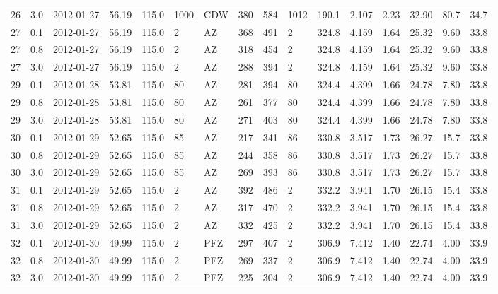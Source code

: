 {{\begin{landscape}
\begin{longtable}{llllllllllllllll}
26 & 3.0 & 2012-01-27 & \textminus{}56.19 & 115.0 & 1000 & CDW & 380 & 584 & 1012 & 190.1 & 2.107 & 2.23 & 32.90 & 80.7 & 34.7\\
27 & 0.1 & 2012-01-27 & \textminus{}56.19 & 115.0 & 2 & AZ & 368 & 491 & 2 & 324.8 & 4.159 & 1.64 & 25.32 & 9.60 & 33.8\\
27 & 0.8 & 2012-01-27 & \textminus{}56.19 & 115.0 & 2 & AZ & 318 & 454 & 2 & 324.8 & 4.159 & 1.64 & 25.32 & 9.60 & 33.8\\
27 & 3.0 & 2012-01-27 & \textminus{}56.19 & 115.0 & 2 & AZ & 288 & 394 & 2 & 324.8 & 4.159 & 1.64 & 25.32 & 9.60 & 33.8\\
29 & 0.1 & 2012-01-28 & \textminus{}53.81 & 115.0 & 80 & AZ & 281 & 394 & 80 & 324.4 & 4.399 & 1.66 & 24.78 & 7.80 & 33.8\\
29 & 0.8 & 2012-01-28 & \textminus{}53.81 & 115.0 & 80 & AZ & 261 & 377 & 80 & 324.4 & 4.399 & 1.66 & 24.78 & 7.80 & 33.8\\
29 & 3.0 & 2012-01-28 & \textminus{}53.81 & 115.0 & 80 & AZ & 271 & 403 & 80 & 324.4 & 4.399 & 1.66 & 24.78 & 7.80 & 33.8\\
30 & 0.1 & 2012-01-29 & \textminus{}52.65 & 115.0 & 85 & AZ & 217 & 341 & 86 & 330.8 & 3.517 & 1.73 & 26.27 & 15.7 & 33.8\\
30 & 0.8 & 2012-01-29 & \textminus{}52.65 & 115.0 & 85 & AZ & 244 & 358 & 86 & 330.8 & 3.517 & 1.73 & 26.27 & 15.7 & 33.8\\
30 & 3.0 & 2012-01-29 & \textminus{}52.65 & 115.0 & 85 & AZ & 269 & 393 & 86 & 330.8 & 3.517 & 1.73 & 26.27 & 15.7 & 33.8\\
31 & 0.1 & 2012-01-29 & \textminus{}52.65 & 115.0 & 2 & AZ & 392 & 486 & 2 & 332.2 & 3.941 & 1.70 & 26.15 & 15.4 & 33.8\\
31 & 0.8 & 2012-01-29 & \textminus{}52.65 & 115.0 & 2 & AZ & 317 & 470 & 2 & 332.2 & 3.941 & 1.70 & 26.15 & 15.4 & 33.8\\
31 & 3.0 & 2012-01-29 & \textminus{}52.65 & 115.0 & 2 & AZ & 332 & 425 & 2 & 332.2 & 3.941 & 1.70 & 26.15 & 15.4 & 33.8\\
32 & 0.1 & 2012-01-30 & \textminus{}49.99 & 115.0 & 2 & PFZ & 297 & 407 & 2 & 306.9 & 7.412 & 1.40 & 22.74 & 4.00 & 33.9\\
32 & 0.8 & 2012-01-30 & \textminus{}49.99 & 115.0 & 2 & PFZ & 269 & 337 & 2 & 306.9 & 7.412 & 1.40 & 22.74 & 4.00 & 33.9\\
32 & 3.0 & 2012-01-30 & \textminus{}49.99 & 115.0 & 2 & PFZ & 225 & 304 & 2 & 306.9 & 7.412 & 1.40 & 22.74 & 4.00 & 33.9\\

\end{longtable}
\end{landscape}}}

